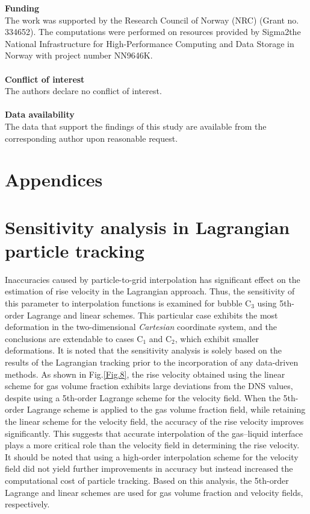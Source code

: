 \documentclass[a4paper,fleqn]{cas-sc}
\begin{document}
	
	{\noindent \bf{Funding}} \\
	
	The work was supported by the Research Council of Norway (NRC) (Grant no. 334652). The computations were performed on resources provided by Sigma2\textemdash the National Infrastructure for High-Performance Computing and Data Storage in Norway with project number NN9646K.\\
	\\
	{\bf{Conflict of interest}} \\
	
	The authors declare no conflict of interest. \\
	\\
	{\bf{Data availability}} \\
	
	The data that support the findings of this study are available from the corresponding author upon reasonable request. \\
	
	\section*{Appendices}
	
	\appendix
	
	\section{Sensitivity analysis in Lagrangian particle tracking}
	\label{Append_A}
	
	
	Inaccuracies caused by particle-to-grid interpolation has significant effect on the estimation of rise velocity in the Lagrangian approach. Thus, the sensitivity of this parameter to interpolation functions is examined for bubble C$_3$ using 5th-order Lagrange and linear schemes. This particular case exhibits the most deformation in the two-dimensional \textit{Cartesian} coordinate system, and the conclusions are extendable to cases C$_1$ and C$_2$, which exhibit smaller deformations. It is noted that the sensitivity analysis is solely based on the results of the Lagrangian tracking prior to the incorporation of any data-driven methods. As shown in Fig.\ref{Fig.8}, the rise velocity obtained using the linear scheme for gas volume fraction exhibits large deviations from the DNS values, despite using a 5th-order Lagrange scheme for the velocity field. When the 5th-order Lagrange scheme is applied to the gas volume fraction field, while retaining the linear scheme for the velocity field, the accuracy of the rise velocity improves significantly. This suggests that accurate interpolation of the gas–liquid interface plays a more critical role than the velocity field in determining the rise velocity. It should be noted that using a high-order interpolation scheme for the velocity field did not yield further improvements in accuracy but instead increased the computational cost of particle tracking. Based on this analysis, the 5th-order Lagrange and linear schemes are used for gas volume fraction and velocity fields, respectively. 
	
\end{document}
